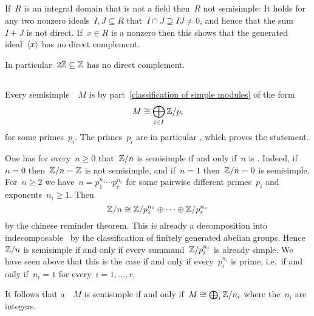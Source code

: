 \subsection{}

If~$R$ is an integral domain that is not a field then~$R$ not semisimple:
It holds for any two nonzero ideals~$I, J \subseteq R$ that~$I \cap J \supseteq IJ \neq 0$, and hence that the sum~$I + J$ is not direct.
If~$x \in R$ is a nonzero  then this shows that the generated ideal~$\langle x\rangle$ has no direct complement.

In particular~$2 \mathbb{Z} \subseteq \mathbb{Z}$ has no direct complement.





\subsection{}

Every semisimple~~$M$ is by part~\ref*{classification of simple modules} of the form
\[
  M \cong \bigoplus_{i \in I} \mathbb{Z}/p_i
\]
for some primes~$p_i$.
The primes~$p_i$ are in particular , which proves the statement.


\begin{remark}
  One has for every~$n \geq 0$ that~$\mathbb{Z}/n$ is semisimple if and only if~$n$ is .
  Indeed, if~$n = 0$ then~$\mathbb{Z}/n = \mathbb{Z}$ is not semisimple, and if~$n = 1$ then~$\mathbb{Z}/n = 0$ is semisimple.
  For~$n \geq 2$ we have~$n = p_1^{n_1} \dotsm p_r^{n_r}$ for some pairwise different primes~$p_i$ and exponents~$n_i \geq 1$.
  Then
  \[
          \mathbb{Z}/n
    \cong \mathbb{Z}/p_1^{n_1} \oplus \dotsb \oplus \mathbb{Z}/p_r^{n_r}
  \]
  by the chinese reminder theorem.
  This is already a decomposition into indecomposable~{\modules{$\Integer$}} by the classification of finitely generated abelian groups.
  Hence~$\mathbb{Z}/n$ is semisimple if and only if every summand~$\mathbb{Z}/p_i^{n_i}$ is already simple.
  We have seen above that this is the case if and only if every~$p_i^{n_i}$ is prime, i.e.\ if and only if~$n_i = 1$ for every~$i = 1, \dotsc, r$.
  
  It follows that a~{\module{$\Integer$}}~$M$ is semisimple if and only if~$M \cong \bigoplus_i \mathbb{Z}/n_i$ where the~$n_i$ are  integers.
\end{remark}


